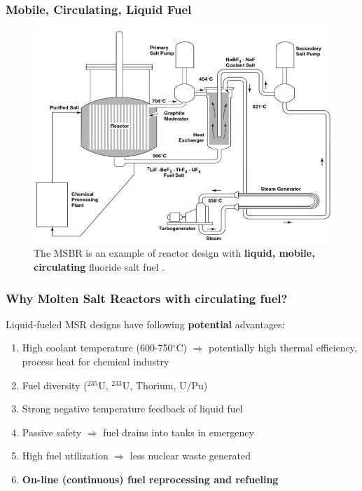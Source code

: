 \begin{frame} %
\frametitle{Mobile, Circulating, Liquid Fuel}
\begin{figure}[t]
\includegraphics[height=0.58\textwidth]{./images/msbr_scheme.png}
\caption{The \gls{MSBR} is an example of reactor design with \textbf{liquid, mobile, circulating} fluoride salt fuel \cite{rosenthal_molten-salt_1970}.}
\end{figure}   

\end{frame}

\begin{frame}
\frametitle{Why Molten Salt Reactors with circulating fuel?}
\begin{block}{Liquid-fueled \gls{MSR} designs have following \textbf{potential} advantages:}
	\begin{enumerate}
		\itemsep1em
		\item High coolant temperature (600-750$^{\circ}$C) 
		$\Rightarrow$ potentially high thermal efficiency, process 
		heat for chemical industry
		\item Fuel diversity ($^{235}$U, $^{233}$U, Thorium, U/Pu)
		\item Strong negative temperature feedback of liquid fuel
		\item Passive safety $\Rightarrow$ fuel drains into tanks 
		in emergency
		\item High fuel utilization $\Rightarrow$ less nuclear 
		waste generated
		\item<2> \textbf{On-line (continuous) fuel reprocessing and refueling}
	\end{enumerate}
\end{block}

\end{frame}


